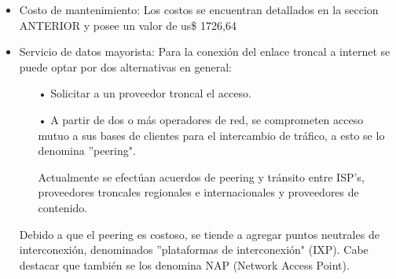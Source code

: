 \begin{itemize}
\item Costo de mantenimiento: Los costos se encuentran detallados en la seccion ANTERIOR y posee un valor de us\$ 1726,64


\item Servicio de datos mayorista:
Para la conexión del enlace troncal a internet se puede optar por dos alternativas
en general:
\begin{enumerate}
\item[•]Solicitar a un proveedor troncal el acceso.
\item[•]A partir de dos o más operadores de red, se comprometen acceso mutuo a sus
bases de clientes para el intercambio de tráfico, a esto se lo denomina ''peering".

Actualmente se efectúan acuerdos de peering y tránsito entre ISP's, proveedores
troncales regionales e internacionales y proveedores de contenido.
\end{enumerate}




Debido a que el peering es costoso, se tiende a agregar puntos
neutrales de interconexión, denominados ''plataformas de interconexión" (IXP).
Cabe destacar que también se los denomina NAP (Network Access Point).


\end{itemize}
